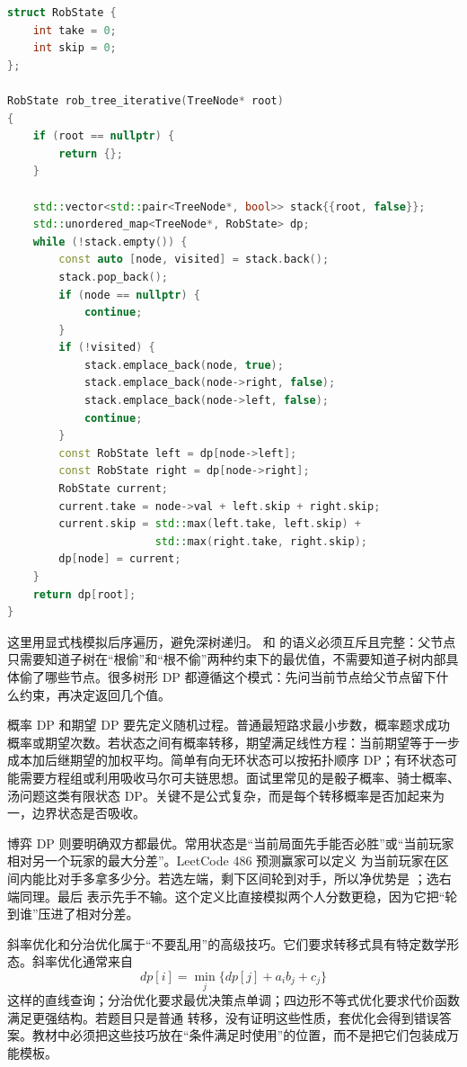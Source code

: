 \begin{lstlisting}[language=C++,caption={LeetCode 337：树形 DP 的两个返回值}]
struct RobState {
    int take = 0;
    int skip = 0;
};

RobState rob_tree_iterative(TreeNode* root)
{
    if (root == nullptr) {
        return {};
    }

    std::vector<std::pair<TreeNode*, bool>> stack{{root, false}};
    std::unordered_map<TreeNode*, RobState> dp;
    while (!stack.empty()) {
        const auto [node, visited] = stack.back();
        stack.pop_back();
        if (node == nullptr) {
            continue;
        }
        if (!visited) {
            stack.emplace_back(node, true);
            stack.emplace_back(node->right, false);
            stack.emplace_back(node->left, false);
            continue;
        }
        const RobState left = dp[node->left];
        const RobState right = dp[node->right];
        RobState current;
        current.take = node->val + left.skip + right.skip;
        current.skip = std::max(left.take, left.skip) +
                       std::max(right.take, right.skip);
        dp[node] = current;
    }
    return dp[root];
}
\end{lstlisting}

这里用显式栈模拟后序遍历，避免深树递归。  和  的语义必须互斥且完整：父节点只需要知道子树在“根偷”和“根不偷”两种约束下的最优值，不需要知道子树内部具体偷了哪些节点。很多树形 DP 都遵循这个模式：先问当前节点给父节点留下什么约束，再决定返回几个值。

概率 DP 和期望 DP 要先定义随机过程。普通最短路求最小步数，概率题求成功概率或期望次数。若状态之间有概率转移，期望满足线性方程：当前期望等于一步成本加后继期望的加权平均。简单有向无环状态可以按拓扑顺序 DP；有环状态可能需要方程组或利用吸收马尔可夫链思想。面试里常见的是骰子概率、骑士概率、汤问题这类有限状态 DP。关键不是公式复杂，而是每个转移概率是否加起来为一，边界状态是否吸收。

博弈 DP 则要明确双方都最优。常用状态是“当前局面先手能否必胜”或“当前玩家相对另一个玩家的最大分差”。LeetCode 486 预测赢家可以定义  为当前玩家在区间内能比对手多拿多少分。若选左端，剩下区间轮到对手，所以净优势是 ；选右端同理。最后  表示先手不输。这个定义比直接模拟两个人分数更稳，因为它把“轮到谁”压进了相对分差。

斜率优化和分治优化属于“不要乱用”的高级技巧。它们要求转移式具有特定数学形态。斜率优化通常来自
\[
dp[i] = \min_j \{dp[j] + a_i b_j + c_j\}
\]
这样的直线查询；分治优化要求最优决策点单调；四边形不等式优化要求代价函数满足更强结构。若题目只是普通  转移，没有证明这些性质，套优化会得到错误答案。教材中必须把这些技巧放在“条件满足时使用”的位置，而不是把它们包装成万能模板。

